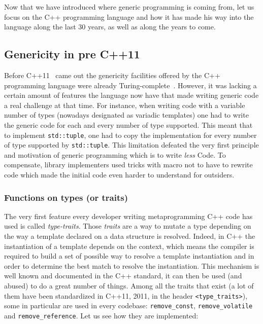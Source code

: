 Now that we have introduced where generic programming is coming from, let us focus on the C++ programming language and
how it has made his way into the language along the last 30 years, as well as along the years to come.

\subsection{Genericity in pre C++11}
\label{sec:precpp11}

Before C++11~\parencite{iso.2011.cpp} came out the genericity facilities offered by the C++ programming language were
already Turing-complete~\parencite{veldhuizen.2003.c++templates}. However, it was lacking a certain amount of features
the language now have that made writing generic code a real challenge at that time. For instance, when writing code with
a variable number of types (nowadays designated as variadic templates) one had to write the generic code for each and
every number of type supported. This meant that to implement \texttt{std::tuple}, one had to copy the implementation for
every number of type supported by \texttt{std::tuple}. This limitation defeated the very first principle and motivation
of generic programming which is to write \emph{less} Code. To compensate, library implementers used tricks with macro
not to have to rewrite code which made the initial code even harder to understand for outsiders.


\subsubsection{Functions on types (or traits)}

The very first feature every developer writing metaprogramming C++ code has used is called \emph{type-traits}. Those
\emph{traits} are a way to mutate a type depending on the way a template declared on a data structure is resolved.
Indeed, in C++ the instantiation of a template depends on the context, which means the compiler is required to build a
set of possible way to resolve a template instantiation and in order to determine the best match to resolve the
instantiation. This mechanism is well known and documented in the C++ standard, it can then be used (and abused) to do a
great number of things. Among all the traits that exist (a lot of them have been standardized in C++11, 2011, in the
header \texttt{<type\_traits>}), some in particular are used in every codebase: \texttt{remove\_const},
\texttt{remove\_volatile} and \texttt{remove\_reference}. Let us see how they are implemented:

